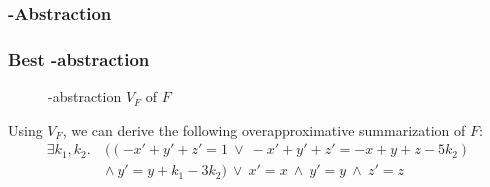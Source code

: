 \begin{frame}
	\frametitle{\qvasr-Abstraction}
\end{frame}

\begin{frame}[t]
	\frametitle{Best \qvasr-abstraction}
	\begin{center}
		\begin{figure}
			
			\caption*{\qvasr-abstraction $V_F$ of $F$}
		\end{figure}
	\end{center}
	\pause
	\begin{center}
	Using $V_F$, we can derive the following overapproximative summarization of $F$:
	\begin{align*}
		\exists k_1, k_2.\ &((-x' + y' + z' = 1\ \lor\ -x' + y' + z' = -x + y + z - 5k_2)\ \\ &\land\ y' = y + k_1 - 3k_2)\ \lor\ x' = x\ \land\ y' = y\ \land\ z' = z
	\end{align*}
	\end{center}
\end{frame}